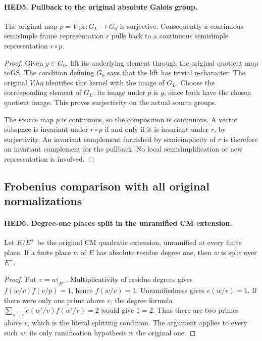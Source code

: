 \documentclass[11pt,a4paper]{article}
\numberwithin{equation}{section}
\theoremstyle{remark}\newtheorem{remark}[theorem]{Remark}
\begin{document}
\paragraph{HED5. Pullback to the original absolute Galois group.}
\label{claim:HED5}
The original map \(p=V.\mathrm{pr}:G_L\to G_0\) is surjective.
Consequently a continuous semisimple frame representation \(r\)
pulls back to a continuous semisimple representation \(r\circ p\).
\begin{proof}
Given \(g\in G_0\), lift its underlying element through the
original quotient map \(\mathrm{toGS}\).  The condition defining
\(G_0\) says that the lift has trivial \(\eta\)-character.
The original \(V.h\eta\) identifies this kernel with the image of
\(G_L\).  Choose the corresponding element of \(G_L\); its image
under \(p\) is \(g\), since both have the chosen quotient image.
This proves surjectivity on the actual source groups.

The source map \(p\) is continuous, so the composition is continuous.
A vector subspace is invariant under \(r\circ p\) if and only if
it is invariant under \(r\), by surjectivity.  An invariant
complement furnished by semisimplicity of \(r\) is therefore an
invariant complement for the pullback.  No local semisimplification
or new representation is involved.
\end{proof}

\subsection{Frobenius comparison with all original normalizations}

\paragraph{HED6. Degree-one places split in the unramified CM extension.}
\label{claim:HED6}
Let \(E/E^+\) be the original CM quadratic extension, unramified at
every finite place.  If a finite place \(w\) of \(E\) has absolute
residue degree one, then \(w\) is split over \(E^+\).
\begin{proof}
Put \(v=w|_{E^+}\).  Multiplicativity of residue degrees gives
\(f(w/v)f(v/p)=1\), hence \(f(w/v)=1\).  Unramifiedness gives
\(e(w/v)=1\).  If there were only one prime above \(v\), the
degree formula \(\sum_{w'\mid v}e(w'/v)f(w'/v)=2\) would give
\(1=2\).  Thus there are two primes above \(v\), which is the
literal splitting condition.  The argument applies to every such
\(w\); its only ramification hypothesis is the original one.
\end{proof}
\end{document}

